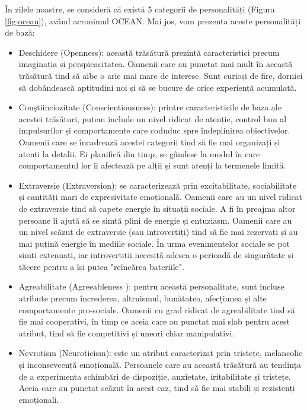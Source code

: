 \documentclass[a4paper, 12pt]{report}
\begin{document}
	În zilele noastre, se consideră că există 5 categorii de personalități (Figura \ref{fig:ocean}), având acronimul OCEAN. Mai jos, vom prezenta aceste personalități de bază:
	\begin{itemize}
		\item Deschidere (Openness): această trăsătură prezintă caracteristici precum imaginația și perspicacitatea. Oamenii care au punctat mai mult în această trăsătură tind să aibe o arie mai mare de interese. Sunt curioși de fire, dornici să dobândească aptitudini noi și să se bucure de orice experiență acumulată.
		
		\item Conştiinciozitate (Conscientiousness): printre caracteristicile de baza ale acestei trăsături, putem include un nivel ridicat de atenție, control bun al impulsurilor și comportamente care coduduc spre îndeplinirea obiectivelor. Oamenii care se încadrează acestei categorii tind să fie mai organizați și atenți la detalii. Ei planifică din timp, se gândesc la modul în care comportamentul lor îi afectează pe alții și sunt atenți la termenele limită.
		
		\item Extraversie (Extraversion): se caracterizează prin excitabilitate, sociabilitate și cantități mari de expresivitate emoțională. Oamenii care au un nivel ridicat de extraversie tind să capete energie în situații sociale. A fi în preajma altor persoane îi ajută să se simtă plini de energie și entuziasm.
		Oamenii care au un nivel scăzut de extraversie (sau introvertiți) tind să fie mai rezervați și au mai puțină energie în mediile sociale. În urma evenimentelor sociale se pot simți extenuați, iar introvertiții necesită adesea o perioadă de singurătate și tăcere pentru a își putea "reîncărca bateriile".
		
		\item Agreabilitate (Agreeableness ): pentru această personalitate, sunt incluse atribute precum încrederea, altruismul, bunătatea, afecțiunea și alte comportamente pro-sociale. Oamenii cu grad ridicat de agreabilitate tind să fie mai cooperativi, în timp ce aceia care au punctat mai slab pentru acest atribut, tind să fie competitivi și uneori chiar manipulativi.
		
		\item Nevrotism (Neuroticism): este un atribut caracterizat prin tristețe, melancolie și inconsevcență emoțională. Persoanele care au această trăsătură au tendința de a experimenta schimbări de dispoziție, anxietate, iritabilitate și tristețe. Aceia care au punctat scăzut în acest caz, tind să fie mai stabili și rezistenți emoționali.
	\end{itemize} 
	
\end{document}
